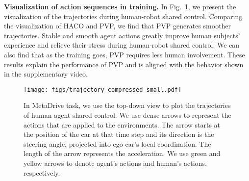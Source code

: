 \textbf{Visualization of action sequences in training.}
In Fig.~\ref{fig:visualization-of-shared-control}, we present the visualization of the trajectories during human-robot shared control. 
Comparing the visualization of HACO and PVP, we find that PVP generates smoother trajectories.
Stable and smooth agent actions greatly improve human subjects' experience and relieve their stress during human-robot shared control. We can also find that as the training goes, PVP requires less human involvement.
These results explain the performance of PVP and is aligned with the behavior shown in the supplementary video.


\newpage

\begin{figure}[H]
\centering
\texttt{[image: figs/trajectory\_compressed\_small.pdf]}
\caption{
In MetaDrive task, we use the top-down view to plot the trajectories of human-agent shared control. We use dense arrows to represent the actions that are applied to the environments. 
The arrow starts at the position of the car at that time step and its direction is the steering angle, projected into ego car's local coordination. The length of the arrow represents the acceleration. 
We use green and yellow arrows to denote agent's actions and human's actions, respectively. 
}
\label{fig:visualization-of-shared-control}
\end{figure}






